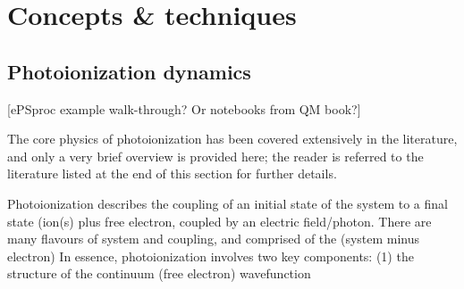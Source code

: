 \section{Concepts \& techniques}

\subsection{Photoionization dynamics} 
[ePSproc example walk-through? Or notebooks from QM book?]

The core physics of photoionization has been covered extensively in the literature, and only a very brief overview is provided here; the reader is referred to the literature listed at the end of this section for further details.

Photoionization describes the coupling of an initial state of the system to a final state (ion(s) plus free electron, coupled by an electric field/photon. There are many flavours of system and coupling, and 
comprised of the (system minus electron)  In essence, photoionization involves two key components: (1) the structure of the continuum (free electron) wavefunction 